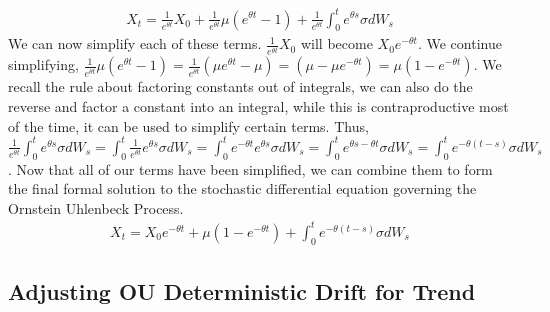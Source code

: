 \documentclass{article}
\begin{document}
\begin{spacing}{2.0}
\begin{gather*}
    X_{t} = \frac{1}{e^{\theta t}} X_{0} + \frac{1}{e^{\theta t}} \mu (e^{\theta t} - 1) + \frac{1}{e^{\theta t}} \int_{0}^{t} e^{\theta s} \sigma dW_{s}
\end{gather*}
We can now simplify each of these terms. $\frac{1}{e^{\theta t}} X_{0}$ will become $X_{0} e^{-\theta t}$. We continue simplifying, $\frac{1}{e^{\theta t}} \mu (e^{\theta t} - 1)
= \frac{1}{e^{\theta t}} \left (\mu e^{\theta t} - \mu \right ) = \left (\mu - \mu e^{-\theta t} \right ) = \mu \left ( 1 - e^{-\theta t} \right )$. We recall the rule about factoring
constants out of integrals, we can also do the reverse and factor a constant into an integral, while this is contraproductive most of the time, it can be used to simplify certain terms.
Thus, $\frac{1}{e^{\theta t}} \int_{0}^{t} e^{\theta s} \sigma dW_{s} = \int_{0}^{t} \frac{1}{e^{\theta t}} e^{\theta s} \sigma dW_{s} = \int_{0}^{t} e^{-\theta t} e^{\theta s} \sigma dW_{s}
= \int_{0}^{t} e^{\theta s -\theta t} \sigma dW_{s} = \int_{0}^{t} e^{-\theta (t - s)} \sigma dW_{s}$. Now that all of our terms have been simplified, we can combine them to form the
final formal solution to the stochastic differential equation governing the Ornstein Uhlenbeck Process.
\begin{gather*}
    X_{t} = X_{0}e^{-\theta t} + \mu \left ( 1 - e^{-\theta t} \right ) + \int_{0}^{t} e^{-\theta (t - s)} \sigma dW_{s}
\end{gather*}

\subsection{Adjusting OU Deterministic Drift for Trend}


\end{spacing}
\end{document}

